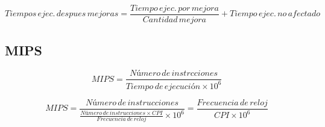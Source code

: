 \documentclass[12pt]{article}
\begin{document}
\begin{equation}
    Tiempos\hspace{2pt}ejec.\hspace{2pt}despues\hspace{2pt}mejoras = \frac{Tiempo\hspace{2pt}ejec.\hspace{2pt}por\hspace{2pt}mejora}{Cantidad\hspace{2pt}mejora} + Tiempo\hspace{2pt}ejec.\hspace{2pt}no\hspace{2pt}afectado
\end{equation}

\subsection*{MIPS}

\begin{equation}
    MIPS = \frac{Número\hspace{2pt}de\hspace{2pt}instrcciones}{Tiempo\hspace{2pt}de\hspace{2pt}ejecución\times10^6}
\end{equation}

\begin{equation}
    MIPS = \frac{Número\hspace{2pt}de\hspace{2pt}instrucciones}{\frac{Número\hspace{2pt}de\hspace{2pt}instrucciones\times CPI}{Frecuencia\hspace{2pt}de\hspace{2pt}reloj}\times 10^6} = \frac{Frecuencia\hspace{2pt}de\hspace{2pt}reloj}{CPI \times 10^6}
\end{equation}
\end{document}
